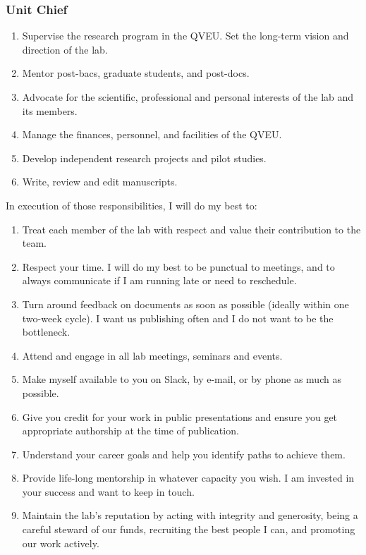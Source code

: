 \documentclass[10pt, letterpaper, twocolumn]{article} %
\begin{document}
\subsubsection{Unit Chief}
\begin{enumerate}
\item Supervise the research program in the QVEU. Set the long-term vision and direction of the lab.
\item Mentor post-bacs, graduate students, and post-docs.
\item Advocate for the scientific, professional and personal interests of the lab and its members.
\item Manage the finances, personnel, and facilities of the QVEU.
\item Develop independent research projects and pilot studies.
\item Write, review and edit manuscripts.
\end{enumerate}
In execution of those responsibilities, I will do my best to:
\begin{enumerate}
\item Treat each member of the lab with respect and value their contribution to the team.
\item Respect your time. I will do my best to be punctual to meetings, and to always communicate if I am running late or need to reschedule.
\item Turn around feedback on documents as soon as possible (ideally within one two-week cycle). I want us publishing often and I do not want to be the bottleneck.
\item Attend and engage in all lab meetings, seminars and events.
\item Make myself available to you on Slack, by e-mail, or by phone as much as possible.
\item Give you credit for your work in public presentations and ensure you get appropriate authorship at the time of publication.
\item Understand your career goals and help you identify paths to achieve them.
\item Provide life-long mentorship in whatever capacity you wish. I am invested in your success and want to keep in touch.
\item Maintain the lab's reputation by acting with integrity and generosity, being a careful steward of our funds, recruiting the best people I can, and promoting our work actively.
\end{enumerate}
\end{document}
